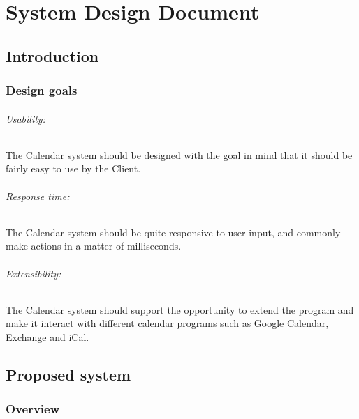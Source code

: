 



\part*{System Design Document}

\begin{versionhistory}
\end{versionhistory}

\chapter*{Introduction}

\section*{Design goals}

\paragraph{Usability: } The Calendar system should be designed with the goal in mind that it should be fairly easy to use by the Client. 

\paragraph{Response time: } The Calendar system should be quite responsive to user input, and commonly make actions in a matter of milliseconds. 

\paragraph{Extensibility: } The Calendar system should support the opportunity to extend the program and make it interact with different calendar programs such as Google Calendar, Exchange and iCal. 



\chapter*{Proposed system}

\section*{Overview}

